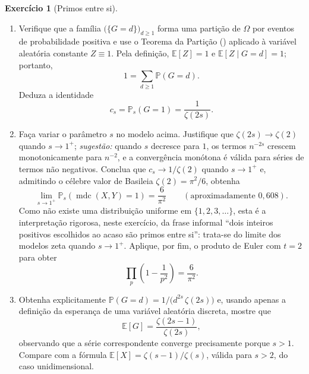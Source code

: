 \documentclass[12pt,portuguese]{article}
\theoremstyle{definition}
\newtheorem{exercise}{Exercício}
\newcommand{\mdc}{\operatorname{mdc}}
\begin{document}
\begin{exercise}[Primos entre si]
\begin{enumerate}[label=(\alph*)]
\[        \qquad \text{para todo } d \geqslant 1.
        \]
        \emph{Sugestão:} escreva a probabilidade do evento \(\{G = d\}\)
        como uma soma sobre os pares \((n, m)\) com
        \(\mdc(n, m) = d\) e reindexe-a por \(n = dk\), \(m = d\ell\), com
        \(\mdc(k, \ell) = 1\).
  \item Verifique que a família \(\bigl(\{G = d\}\bigr)_{d \geqslant 1}\)
        forma uma partição de \(\Omega\) por eventos de probabilidade
        positiva e use o Teorema da Partição
        () aplicado à variável aleatória
        constante \(Z\equiv1\). Pela definição,
        \(\mathbb{E}[Z]=1\) e \(\mathbb{E}[Z\mid G=d]=1\); portanto,
        \[
        1 = \sum_{d \geqslant 1} \mathbb{P}(G=d).
        \]
        Deduza a identidade
        \[
        c_s=\mathbb{P}_s(G = 1) = \frac{1}{\zeta(2s)}.
        \]
  \item Faça variar o parâmetro \(s\) no modelo acima. Justifique que
        \(\zeta(2s)\to\zeta(2)\) quando \(s\to1^+\);
        \emph{sugestão:} quando \(s\) decresce para \(1\), os termos
        \(n^{-2s}\) crescem monotonicamente para \(n^{-2}\), e a
        convergência monótona é válida para séries de termos não
        negativos. Conclua que \(c_s\to1/\zeta(2)\) quando \(s\to1^+\) e,
        admitindo o célebre valor de Basileia \(\zeta(2) = \pi^2/6\),
        obtenha
        \[
        \lim_{s\to1^+}\mathbb{P}_s(\mdc(X,Y)=1)
        =\frac{6}{\pi^2}
        \qquad (\text{aproximadamente }0{,}608).
        \]
        Como não existe uma distribuição uniforme em
        \(\{1,2,3,\ldots\}\), esta é a interpretação rigorosa, neste
        exercício, da frase informal ``dois inteiros positivos escolhidos ao
        acaso são primos entre si'': trata-se do limite dos modelos zeta
        quando \(s\to1^+\).
        Aplique, por fim, o produto de Euler com \(t = 2\) para obter
        \[
        \prod_{p} \left(1 - \frac{1}{p^2}\right) = \frac{6}{\pi^2}.
        \]
  \item Obtenha explicitamente
        \(\mathbb{P}(G = d) = 1/\bigl(d^{2s}\,\zeta(2s)\bigr)\) e, usando
        apenas a definição da esperança de uma variável aleatória discreta,
        mostre
        que
        \[
        \mathbb{E}[G] = \frac{\zeta(2s-1)}{\zeta(2s)},
        \]
        observando que a série correspondente converge precisamente porque
        \(s > 1\). Compare com a fórmula
        \(\mathbb{E}[X] = \zeta(s-1)/\zeta(s)\), válida para \(s > 2\),
        do caso unidimensional.
\end{enumerate}
\end{exercise}
\end{document}

